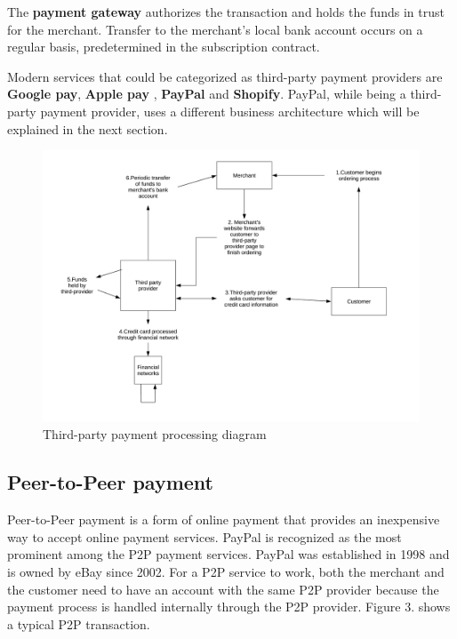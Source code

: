 \documentclass{ferseminar}
\begin{document}
The \textbf{payment gateway} authorizes the transaction and holds the funds in trust for the merchant. Transfer to the merchant's local bank account occurs on a regular basis, predetermined in the subscription contract.

Modern services that could be categorized as third-party payment providers are \textbf{Google pay}, \textbf{Apple pay} \cite{Google}, \textbf{PayPal} and \textbf{Shopify}. PayPal, while being a third-party payment provider, uses a different business architecture which will be explained in the next section.

\begin{figure}[t]
	\caption{Third-party payment processing diagram}
	\includegraphics[scale=0.6]{diagram2}
	\centering
\end{figure}

\subsection{Peer-to-Peer payment}

Peer-to-Peer payment is a form of online payment that provides an inexpensive way to accept online payment services. PayPal is recognized as the most prominent among the P2P payment services. PayPal was established in 1998 and is owned by eBay since 2002. For a P2P service to work, both the merchant and the customer need to have an account with the same P2P provider because the payment process is handled internally through the P2P provider. Figure 3. shows a typical P2P transaction.
\end{document}
